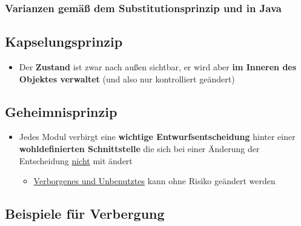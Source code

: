 \subsubsection{Varianzen gemäß dem Substitutionsprinzip und in Java}

\begin{center}
\end{center}

\subsection{Kapselungsprinzip}
		
\begin{itemize}
\item Der \textbf{Zustand} ist zwar nach außen sichtbar, er wird aber \textbf{im Inneren des Objektes verwaltet} (und also nur kontrolliert geändert)
\end{itemize}
		
\subsection{Geheimnisprinzip}
	
\begin{itemize}
\item Jedes Modul verbirgt eine \textbf{wichtige Entwurfsentscheidung} hinter einer \textbf{wohldefinierten Schnittstelle} die sich bei einer Änderung der Entscheidung \underline{nicht} mit ändert
\begin{itemize}
\item \underline{Verborgenes und Unbenutztes} kann ohne Risiko geändert werden
\end{itemize}
\end{itemize}
		
\subsection{Beispiele für Verbergung}
		
